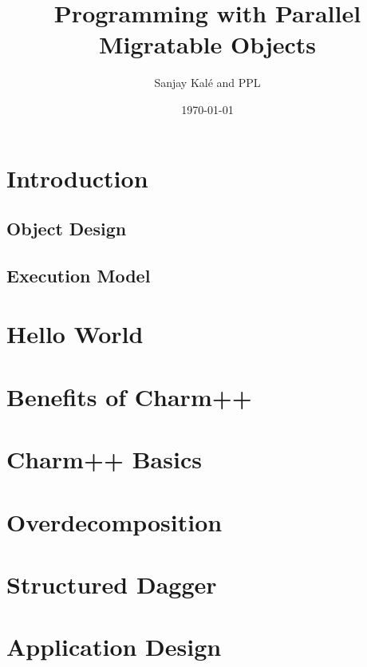 \documentclass{beamer}
\title[Parallel Migratable Objects]{Programming with Parallel Migratable Objects}
\institute[UIUC]{Parallel Programming Laboratory \\University of Illinois Urbana-Champaign}
\author{Sanjay Kal\'e and PPL}
\date{\today}
\begin{document}
\frame{\titlepage}

\section[Concepts]{Introduction}

\subsection[Object Design]{Object Design}


\subsection[Execution Mode]{Execution Model}

\section[Hello World]{Hello World}

\section[Benefits]{Benefits of Charm++}

\section[Charm++]{Charm++ Basics}


\section[Overdecomposition]{Overdecomposition}

\section[Charm++]{Structured Dagger}


\section[Application Design]{Application Design}

\end{document}
